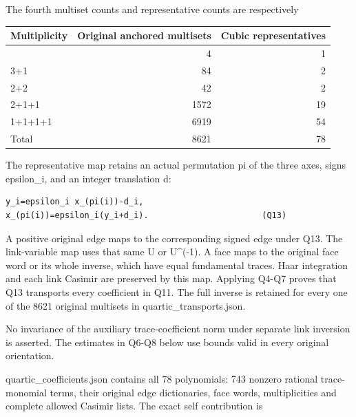 \documentclass[11pt,a4paper]{article}
\newcounter{none}
\renewcommand{\[}{\begingroup\small\originaldisplaystart}
\renewcommand{\]}{\originaldisplayend\endgroup}
\begin{document}
The fourth multiset counts and representative counts are respectively

{\def\LTcaptype{none} %
\begin{longtable}[]{@{}lrr@{}}
\toprule\noalign{}
Multiplicity & Original anchored multisets & Cubic representatives \\
\midrule\noalign{}
\endhead
\bottomrule\noalign{}
\endlastfoot
4 & 4 & 1 \\
3+1 & 84 & 2 \\
2+2 & 42 & 2 \\
2+1+1 & 1572 & 19 \\
1+1+1+1 & 6919 & 54 \\
Total & 8621 & 78 \\
\end{longtable}
}

The representative map retains an actual permutation pi of the three
axes, signs epsilon\_i, and an integer translation d:

\begin{verbatim}
y_i=epsilon_i x_(pi(i))-d_i,
x_(pi(i))=epsilon_i(y_i+d_i).                       (Q13)
\end{verbatim}

A positive original edge maps to the corresponding signed edge under
Q13. The link-variable map uses that same U or U\^{}(-1). A face maps to
the original face word or its whole inverse, which have equal
fundamental traces. Haar integration and each link Casimir are preserved
by this map. Applying Q4-Q7 proves that Q13 transports every coefficient
in Q11. The full inverse is retained for every one of the 8621 original
multisets in
{\ttfamily q\allowbreak{}u\allowbreak{}a\allowbreak{}r\allowbreak{}t\allowbreak{}i\allowbreak{}c\allowbreak{}\_\allowbreak{}t\allowbreak{}r\allowbreak{}a\allowbreak{}n\allowbreak{}s\allowbreak{}p\allowbreak{}o\allowbreak{}r\allowbreak{}t\allowbreak{}s\allowbreak{}.\allowbreak{}j\allowbreak{}s\allowbreak{}o\allowbreak{}n\allowbreak{}}.

No invariance of the auxiliary trace-coefficient norm under separate
link inversion is asserted. The estimates in Q6-Q8 below use bounds
valid in every original orientation.

{\ttfamily q\allowbreak{}u\allowbreak{}a\allowbreak{}r\allowbreak{}t\allowbreak{}i\allowbreak{}c\allowbreak{}\_\allowbreak{}c\allowbreak{}o\allowbreak{}e\allowbreak{}f\allowbreak{}f\allowbreak{}i\allowbreak{}c\allowbreak{}i\allowbreak{}e\allowbreak{}n\allowbreak{}t\allowbreak{}s\allowbreak{}.\allowbreak{}j\allowbreak{}s\allowbreak{}o\allowbreak{}n\allowbreak{}}
contains all 78 polynomials: 743 nonzero rational trace-monomial terms,
their original edge dictionaries, face words, multiplicities and
complete allowed Casimir lists. The exact self contribution is
\end{document}

